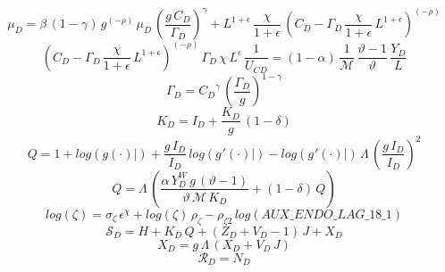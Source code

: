 \documentclass[10pt,a4paper]{article}
\begin{document}
\begin{dmath}
{{\mu}_{D}}=\beta\, \left(1-\gamma\right)\, {g}^{\left(-\rho\right)}\, {{\mu}_{D}}\, \left(\frac{{g}\, {C_D}}{{\Gamma_D}}\right)^{\gamma}+{L}^{1+\epsilon}\, \frac{\chi}{1+\epsilon}\, \left({C_D}-{\Gamma_D}\, \frac{\chi}{1+\epsilon}\, {L}^{1+\epsilon}\right)^{\left(-\rho\right)}
\end{dmath}
\begin{dmath}
\left({C_D}-{\Gamma_D}\, \frac{\chi}{1+\epsilon}\, {L}^{1+\epsilon}\right)^{\left(-\rho\right)}\, {\Gamma_D}\, \chi\, {L}^{\epsilon}\, \frac{1}{{U_{CD}}}=\left(1-\alpha\right)\, \frac{1}{\mathcal{M}}\, \frac{\vartheta-1}{\vartheta}\, \frac{{Y_D}}{{L}}
\end{dmath}
\begin{dmath}
{\Gamma_D}={C_D}^{\gamma}\, \left(\frac{{\Gamma_D}}{{g}}\right)^{1-\gamma}
\end{dmath}
\begin{dmath}
{K_D}={I_D}+\frac{{K_D}}{{g}}\, \left(1-\delta\right)
\end{dmath}
\begin{dmath}
{Q}=1+log\left({\left.       g\left( \cdot \right)            \right|}\right)+\frac{{g}\, {I_D}}{{I_D}}\, log\left({\left.       g^‎{\prime}\left( \cdot \right)   \right|}\right)-log\left({\left.       g^‎{\prime}\left( \cdot \right)   \right|}\right)\, {\Lambda}\, \left(\frac{{g}\, {I_D}}{{I_D}}\right)^{2}
\end{dmath}
\begin{dmath}
{Q}={\Lambda}\, \left(\frac{\alpha\, {Y^W_D}\, {g}\, \left(\vartheta-1\right)}{\vartheta\, \mathcal{M}\, {K_D}}+\left(1-\delta\right)\, {Q}\right)
\end{dmath}
\begin{dmath}
log\left({\zeta}\right)={\sigma}_{\zeta}\, {\epsilon}^{\chi}+log\left({\zeta}\right)\, {\rho}_{\zeta}-{\rho}_{\zeta2}\, log\left(AUX\_ENDO\_LAG\_18\_1\right)
\end{dmath}
\begin{dmath}
{\mathcal{S}_{D}}={H}+{K_D}\, {Q}+\left({Z_D}+{V_D}-1\right)\, {J}+{X_D}
\end{dmath}
\begin{dmath}
{X_D}={g}\, {\Lambda}\, \left({X_D}+{V_D}\, {J}\right)
\end{dmath}
\begin{dmath}
{\mathcal{R}_{D}}={N_D}
\end{dmath}
\end{document}
